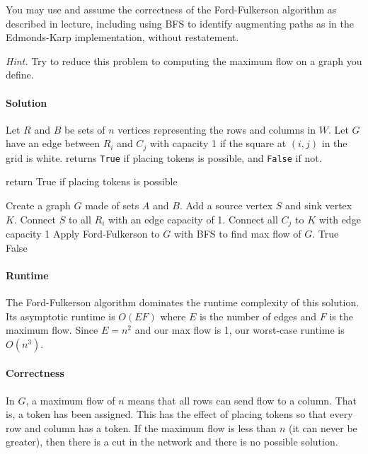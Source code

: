 \documentclass[11pt]{article}
\begin{document}
You may use and assume the correctness of the Ford-Fulkerson algorithm as described in lecture, including using BFS to identify augmenting paths as in the Edmonds-Karp implementation, without restatement.

\textit{Hint.} Try to reduce this problem to computing the maximum flow on a graph you define.

\paragraph{Solution}
Let $R$ and $B$ be sets of $n$ vertices representing the rows and columns in
$W$. Let $G$ have an edge between $R_{i}$ and $C_{j}$ with capacity 1 if the
square at $(i,j)$ in the grid is white.  returns
\texttt{True} if placing tokens is possible, and \texttt{False} if not.

\begin{algorithm}
\caption{return True if placing tokens is possible}
\begin{algorithmic}[1]
    \State Create a graph $G$ made of sets $A$ and $B$.
    \State Add a source vertex $S$ and sink vertex $K$.
    \State Connect $S$ to all $R_{i}$ with an edge capacity of 1.
    \State Connect all $C_{j}$ to $K$ with edge capacity 1
    \State Apply Ford-Fulkerson to $G$ with BFS to find max flow of $G$.
        \State \Return True
    \Else
        \State \Return False
    \EndIf
\EndProcedure 
\end{algorithmic}
\end{algorithm}

\paragraph{Runtime}

The Ford-Fulkerson algorithm dominates the runtime complexity of this solution.
Its asymptotic runtime is $O(EF)$ where $E$ is the number of edges and $F$ is
the maximum flow. Since $E=n^{2}$ and our max flow is 1, our worst-case runtime
is $O(n^{3})$.

\paragraph{Correctness}

In $G$, a maximum flow of $n$ means that all rows can send flow to a column.
That is, a token has been assigned. This has the effect of placing tokens so
that every row and column has a token. If the maximum flow is less than $n$
(it can never be greater), then there is a cut in the network and there is no
possible solution.
\end{document}
